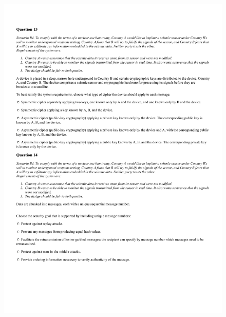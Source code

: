 \begin{figure}[!h]
    \begin{center}
    \advance\leftskip-3cm
    \advance\rightskip-3cm
    \includegraphics[scale=.25]{images/exam/correctly_formated_exam-06.jpg}
    \label{fig:correctly_formated_exam-06}
\end{center}
\end{figure}

